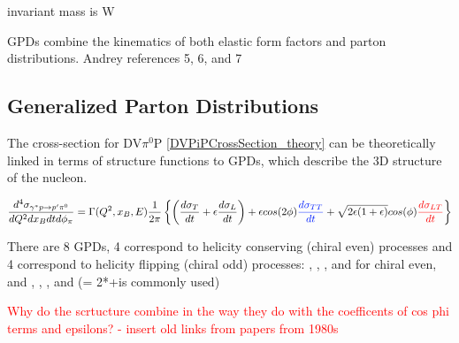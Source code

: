 invariant mass is W 

GPDs combine the kinematics of both elastic form factors and parton distributions. Andrey references 5, 6, and 7


\subsection{Generalized Parton Distributions}

          The cross-section for DV$\pi^0$P \eqref{DVPiPCrossSection_theory} can be theoretically linked in terms of structure functions to GPDs, which describe the 3D structure of the nucleon.


          
    
     \begin{equation}\labelAndRemember{eq:DVPiPCrossSection_theory}
           {\frac{d^4\sigma_{\gamma^*p \rightarrow p'\pi^0}}{dQ^2dx_Bdtd\phi_{\pi}} =
         \Gamma (Q^2, x_B, E)
         \frac{1}{2\pi}
         \left\{ \left(  \textcolor{sigmaT}{\frac{d\sigma_T}{dt}}+\epsilon  \textcolor{sigmaL}{\frac{d\sigma_L}{dt}} \right)+
         \epsilon cos(2\phi)  \textcolor{sigmaTT}{\frac{d\sigma_{TT}}{dt}} + 
         \sqrt{2\epsilon(1+\epsilon)} cos(\phi)  \textcolor{sigmaLT}{\frac{d\sigma_{LT}}{dt}} \right\}}
     \end{equation}      
    



    There are 8 GPDs, 4 correspond to helicity conserving (chiral even) processes and 4 correspond to helicity flipping (chiral odd) processes: \GPDH,  \GPDE,  \GPDHtilde,  and \GPDEtilde  \quad for chiral even, and \GPDHT,  \GPDET,  \GPDHTtilde, and \GPDETtilde (\GPDETbar = 2*\GPDHTtilde+\GPDET is commonly used)

    \textcolor{red}{    Why do the scrtucture combine in the way they do with the coefficents of cos phi terms and epsilons? - insert old links from papers from 1980s}
    
